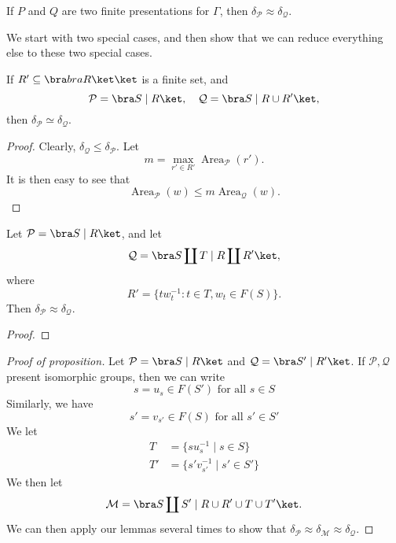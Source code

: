 \documentclass[a4paper]{article}
\DeclareMathOperator\Area{Area}
\begin{document}
\begin{prop}
  If $P$ and $Q$ are two finite presentations for $\Gamma$, then $\delta_{\mathcal{P}} \approx \delta_{\mathcal{Q}}$.
\end{prop}

We start with two special cases, and then show that we can reduce everything else to these two special cases.
\begin{lemma}
  If $R' \subseteq \bra bra R \ket \ket$ is a finite set, and
  \[
    \mathcal{P} = \bra S \mid R \ket,\quad \mathcal{Q} = \bra S \mid R \cup R'\ket,
  \]
  then $\delta_{\mathcal{P}} \simeq \delta_{\mathcal{Q}}$.
\end{lemma}

\begin{proof}
  Clearly, $\delta_{\mathcal{Q}} \leq \delta_{\mathcal{P}}$. Let 
  \[
    m= \max_{r' \in R'} \Area_{\mathcal{P}}(r').
  \]
  It is then easy to see that
  \[
    \Area_{\mathcal{P}}(w) \leq m \Area_{\mathcal{Q}}(w).
  \]
\end{proof}

\begin{lemma}
  Let $\mathcal{P} = \bra S \mid R\ket$, and let
  \[
    \mathcal{Q} = \bra S \coprod T \mid R \coprod R'\ket,
  \]
  where
  \[
    R' = \{t w_t^{-1}: t \in T, w_t \in F(S)\}.
  \]
  Then $\delta_{\mathcal{P}} \approx \delta_{\mathcal{Q}}$.
\end{lemma}

\begin{proof}
%  
\end{proof}

\begin{proof}[Proof of proposition]
  Let $\mathcal{P} = \bra S \mid R \ket$ and $\mathcal{Q} = \bra S' \mid R'\ket$. If $\mathcal{P}, \mathcal{Q}$ present isomorphic groups, then we can write
  \[
    s = u_{s} \in F(S') \text{ for all }s \in S
  \]
  Similarly, we have
  \[
    s' = v_{s'} \in F(S)\text{ for all }s' \in S'
  \]
  We let
  \begin{align*}
    T &= \{s u_s^{-1} \mid s \in S\}\\
    T' &= \{s' v_{s'}^{-1} \mid s' \in S'\}
  \end{align*}
  We then let
  \[
    \mathcal{M} = \bra S \coprod S' \mid R \cup R' \cup T \cup T'\ket.
  \]
  We can then apply our lemmas several times to show that $\delta_{\mathcal{P}} \approx \delta_{\mathcal{M}} \approx \delta_{\mathcal{Q}}$.
\end{proof}

\printindex
\end{document}
